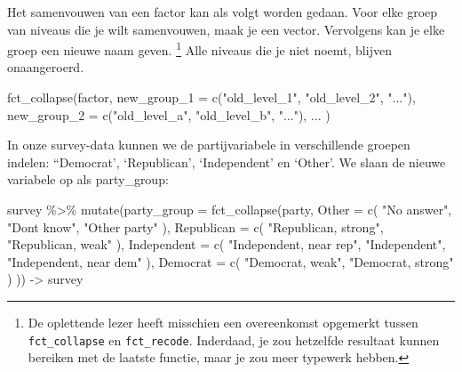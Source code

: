 \documentclass[]{tufte-book}
\newenvironment{Shaded}{}{}
\newcommand{\AttributeTok}[1]{\textcolor[rgb]{0.49,0.56,0.16}{#1}}
\newcommand{\FunctionTok}[1]{\textcolor[rgb]{0.02,0.16,0.49}{#1}}
\newcommand{\NormalTok}[1]{#1}
\newcommand{\OtherTok}[1]{\textcolor[rgb]{0.00,0.44,0.13}{#1}}
\newcommand{\SpecialCharTok}[1]{\textcolor[rgb]{0.25,0.44,0.63}{#1}}
\newcommand{\StringTok}[1]{\textcolor[rgb]{0.25,0.44,0.63}{#1}}
\begin{document}
Het samenvouwen van een factor kan als volgt worden gedaan. Voor elke groep van niveaus die je wilt samenvouwen, maak je een vector. Vervolgens kan je elke groep een nieuwe naam geven. \footnote{De oplettende lezer heeft misschien een overeenkomst opgemerkt tussen \texttt{fct\_collapse} en \texttt{fct\_recode}. Inderdaad, je zou hetzelfde resultaat kunnen bereiken met de laatste functie, maar je zou meer typewerk hebben.} Alle niveaus die je niet noemt, blijven onaangeroerd.

\begin{Shaded}
\begin{Highlighting}[]
\FunctionTok{fct\_collapse}\NormalTok{(factor,}
  \AttributeTok{new\_group\_1 =} \FunctionTok{c}\NormalTok{(}\StringTok{"old\_level\_1"}\NormalTok{, }\StringTok{"old\_level\_2"}\NormalTok{, }\StringTok{"..."}\NormalTok{),}
  \AttributeTok{new\_group\_2 =} \FunctionTok{c}\NormalTok{(}\StringTok{"old\_level\_a"}\NormalTok{, }\StringTok{"old\_level\_b"}\NormalTok{, }\StringTok{"..."}\NormalTok{),}
\NormalTok{  ...}
\NormalTok{)}
\end{Highlighting}
\end{Shaded}

In onze survey-data kunnen we de partijvariabele in verschillende groepen indelen: ``Democrat', `Republican', `Independent' en `Other'. We slaan de nieuwe variabele op als party\_group:

\begin{Shaded}
\begin{Highlighting}[]
\NormalTok{survey }\SpecialCharTok{\%\textgreater{}\%}
  \FunctionTok{mutate}\NormalTok{(}\AttributeTok{party\_group =} \FunctionTok{fct\_collapse}\NormalTok{(party,}
    \AttributeTok{Other =} \FunctionTok{c}\NormalTok{(}
      \StringTok{"No answer"}\NormalTok{,}
      \StringTok{"Don\textquotesingle{}t know"}\NormalTok{,}
      \StringTok{"Other party"}
\NormalTok{    ),}
    \AttributeTok{Republican =} \FunctionTok{c}\NormalTok{(}
      \StringTok{"Republican, strong"}\NormalTok{,}
      \StringTok{"Republican, weak"}
\NormalTok{    ),}
    \AttributeTok{Independent =} \FunctionTok{c}\NormalTok{(}
      \StringTok{"Independent, near rep"}\NormalTok{,}
      \StringTok{"Independent"}\NormalTok{,}
      \StringTok{"Independent, near dem"}
\NormalTok{    ),}
    \AttributeTok{Democrat =} \FunctionTok{c}\NormalTok{(}
      \StringTok{"Democrat, weak"}\NormalTok{,}
      \StringTok{"Democrat, strong"}
\NormalTok{    )}
\NormalTok{  )) }\OtherTok{{-}\textgreater{}}\NormalTok{ survey}
\end{Highlighting}
\end{Shaded}
\end{document}
